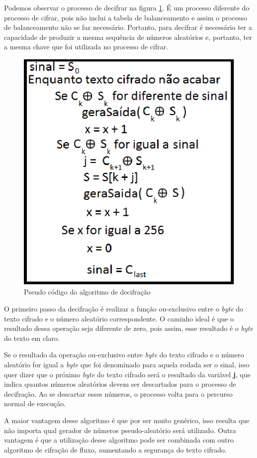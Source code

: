 Podemos observar o processo de decifrar na figura \ref{pseudo-codigo-decifrar}. É um processo diferente do processo de cifrar, pois não inclui a tabela de balanceamento e assim o processo de balanceamento não se faz necessário. Portanto, para decifrar é necessário ter a capacidade de produzir a mesma sequência de números aleatórios e, portanto, ter a mesma chave que foi utilizada no processo de cifrar. 


\begin{figure}[h]
	\centering
	\includegraphics[scale=1]{figuras/funcionamento_Decifra.eps}
	\caption{Pseudo código do algoritmo de decifração}
	\label{pseudo-codigo-decifrar}
\end{figure}

O primeiro passo da decifração é realizar a função ou-exclusivo entre o \textit{byte} do texto cifrado e o número aleatório correspondente. O caminho ideal é que o resultado dessa operação seja diferente de zero, pois assim, esse resultado é o \textit{byte} do texto em claro.

Se o resultado da operação ou-exclusivo entre \textit{byte} do texto cifrado e o número aleatório for igual a \textit{byte} que foi denominado para aquela rodada ser o sinal, isso quer dizer que o próximo \textit{byte} do texto cifrado será o resultado da variável \textbf{j}, que indica quantos números aleatórios devem ser descartados para o processo de decifração. Ao se descartar esses números, o processo volta para o percurso normal de execução. 

A maior vantagem desse algoritmo é que por ser muito genérico, isso resulta que não importa qual gerador de números pseudo-aleatório será utilizado. Outra vantagem é que a utilização desse algoritmo pode ser combinada com outro algoritmo de cifração de fluxo, aumentando a segurança do texto cifrado.